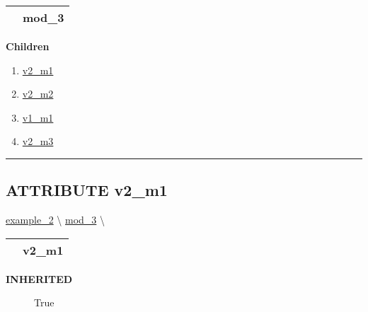 {\renewcommand{\arraystretch}{1.5}
\begin{tabularx}{\textwidth}{|>{\raggedright\arraybackslash}l|X|}
\hline
\hspace{0pt}\mytexttt{\color{red} } & \textbf{mod\_3} \\
\hline
\end{tabularx}
}

\par


\textbf{Children}
\begin{enumerate}
\item \hyperlink{ecldoc:intest.inintest.example_2.mod_1.v2_m1}{v2\_m1}
\item \hyperlink{ecldoc:intest.inintest.example_2.mod_2.v2_m2}{v2\_m2}
\item \hyperlink{ecldoc:intest.inintest.example_2.mod_3.v1_m1}{v1\_m1}
\item \hyperlink{ecldoc:intest.inintest.example_2.mod_3.v2_m3}{v2\_m3}
\end{enumerate}

\rule{\linewidth}{0.5pt}

\subsection*{\textsf{\colorbox{headtoc}{\color{white} ATTRIBUTE}
v2\_m1}}

\hypertarget{ecldoc:intest.inintest.example_2.mod_1.v2_m1}{}
\hspace{0pt} \hyperlink{ecldoc:intest.inintest.example_2}{example_2} \textbackslash 
\hspace{0pt} \hyperlink{ecldoc:intest.inintest.example_2.mod_3}{mod_3} \textbackslash 

{\renewcommand{\arraystretch}{1.5}
\begin{tabularx}{\textwidth}{|>{\raggedright\arraybackslash}l|X|}
\hline
\hspace{0pt}\mytexttt{\color{red} } & \textbf{v2\_m1} \\
\hline
\end{tabularx}
}

\par

\par
\begin{description}
\item [\colorbox{tagtype}{\color{white} \textbf{\textsf{INHERITED}}}] \textbf{\underline{}} True
\end{description}

